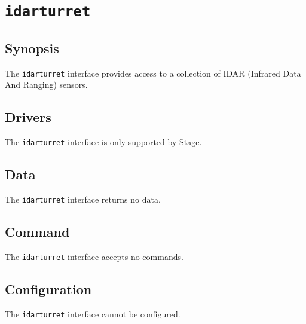 \section{{\tt idarturret}}
\subsection*{Synopsis}
The {\tt idarturret} interface provides access to a collection of IDAR
(Infrared Data And Ranging) sensors.

\subsection*{Drivers}
The {\tt idarturret} interface is only supported by Stage.

\subsection*{Data}
The {\tt idarturret} interface returns no data.

\subsection*{Command}
The {\tt idarturret} interface accepts no commands.

\subsection*{Configuration}
The {\tt idarturret} interface cannot be configured.
